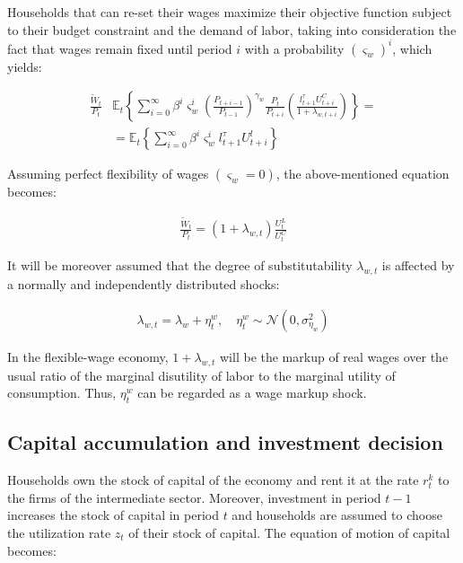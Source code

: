\documentclass{pracamgr}
\numberwithin{equation}{section}
\begin{document}
Households that can re-set their wages maximize their objective function subject to their budget constraint and the demand of labor, taking into consideration the fact that wages remain fixed until period $i$ with a probability $\left( \varsigma_{w} \right)^{i}$, which yields:

\begin{align}
\frac{\widetilde{W}_{t}}{P_{t}} &\mathbb{E}_{t} \left\{ \sum\limits_{i=0}^{\infty} \beta^{i} \varsigma_{w}^{i} \left( \frac{P_{t+i-1}}{P_{t-1}} \right)^{\gamma_{w}}  \frac{P_{t}}{P_{t+i}} \left( \frac{l_{t+1}^{\tau} U_{t+i}^{C}}{1 + \lambda_{w, t+i}} \right) \right\} = \nonumber \\
&= \mathbb{E}_{t} 
\left\{ \sum\limits_{i=0}^{\infty} \beta^{i} \varsigma_{w}^{i} l_{t+1}^{\tau} U_{t+i}^{l} \right\}
\end{align}

Assuming perfect flexibility of wages $(\varsigma_{w} = 0)$, the above-mentioned equation becomes:

\begin{align}
\frac{\widetilde{W}_{t}}{P_{t}} = \left(1 + \lambda_{w, t} \right)\frac{U_{t}^{L}}{U_{t}^{C}}
\end{align}

It will be moreover assumed that the degree of substitutability $\lambda_{w, t}$ is affected by a normally and independently distributed shocks:

\begin{align}
\lambda_{w, t} = \lambda_{w} + \eta_{t}^{w}, \quad \eta_{t}^{w} \sim \mathcal{N} \left(0, \sigma^{2}_{\eta_{w}} \right)
\end{align}

In the flexible-wage economy, $1+\lambda_{w, t}$ will be the markup of real wages over the usual ratio of the marginal disutility of labor to the marginal utility of consumption. Thus, $\eta_{t}^{w}$ can be regarded as a wage markup shock.

\subsection{Capital accumulation and investment decision} \label{Capital accumulation and investment decision}

Households own the stock of capital of the economy and rent it at the rate $r_{t}^{k}$ to the firms of the intermediate sector. Moreover, investment in period $t-1$ increases the stock of capital in period $t$ and households are assumed to choose the utilization rate $z_{t}$ of their stock of capital. The equation of motion of capital becomes:
\end{document}
